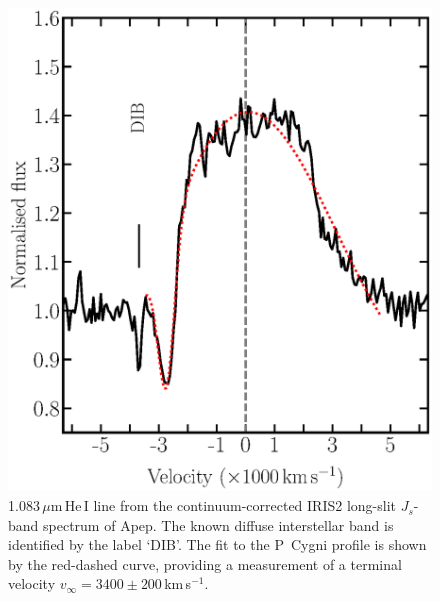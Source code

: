 \documentclass[preprint,times]{aastex61}
\begin{document}
\begin{figure}
\begin{center}
    \includegraphics[scale=0.5]{he1083_velocity_fit_overplot_noouter.eps}
    \caption{1.083\,$\mu$m\,He\,I line from the continuum-corrected IRIS2 long-slit $J_{s}$-band spectrum of Apep. The known diffuse interstellar band is identified by the label `DIB'. The fit to the P~Cygni profile is shown by the red-dashed curve, providing a measurement of a terminal velocity $v_{\infty} = 3400 \pm 200$\,km\,s$^{-1}$.}
    \label{fig:he1_line}
   \end{center}
\end{figure}
\end{document}
